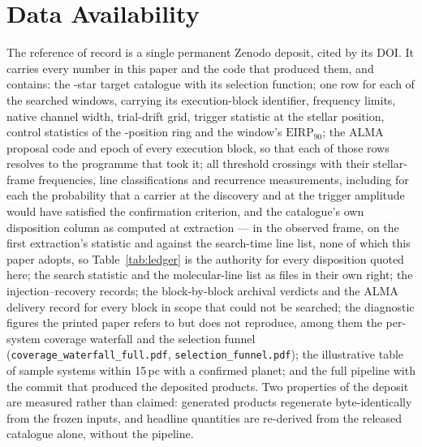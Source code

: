 \section*{Data Availability}
\label{sec:data}
The reference of record is a single permanent Zenodo deposit, cited by its
DOI. It carries every number in this paper and the code that produced them,
and contains: the \NStars-star target catalogue with its selection
function; one row for each of the \NWindows{} searched windows, carrying
its execution-block identifier, frequency limits,
native channel width, trial-drift grid, trigger statistic at the stellar
position, control statistics of the \NCtrl-position ring and the window's
$\mathrm{EIRP}_{90}$; the ALMA proposal code and epoch of every execution
block, so that each of those rows resolves to the programme that took it;
all \EvNCrossRaw{} threshold crossings with their
stellar-frame frequencies, line classifications and recurrence
measurements, including for each the probability that a carrier at the
discovery and at the trigger amplitude would have satisfied the confirmation
criterion, and the catalogue's own disposition column as computed at
extraction --- in the observed frame, on the first extraction's statistic and
against the search-time line list, none of which this paper adopts, so
Table~\ref{tab:ledger} is the authority for every disposition quoted here; the search statistic and the molecular-line list as
files in their own right; the injection--recovery records; the block-by-block
archival verdicts and the ALMA delivery record for every block in scope
that could not be searched; the diagnostic figures the printed paper refers
to but does not reproduce, among them the per-system coverage waterfall and
the selection funnel (\texttt{coverage\_waterfall\_full.pdf},
\texttt{selection\_funnel.pdf}); the illustrative table of sample systems
within 15\,pc with a confirmed planet; and the full pipeline with the
commit that produced the deposited products. Two properties of the deposit are
measured rather than claimed: \NRegenProducts{} generated products
regenerate byte-identically from the frozen inputs, and \NReproChecks{}
headline quantities are re-derived from the released catalogue alone,
without the pipeline.

